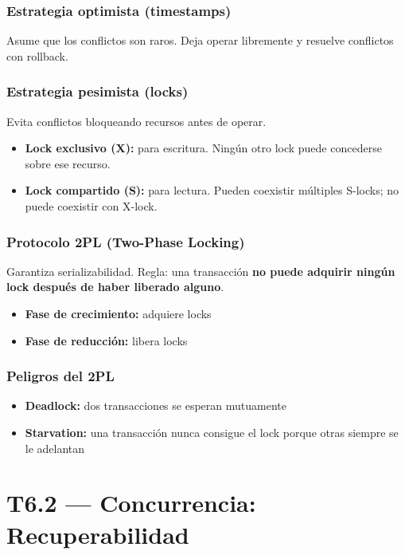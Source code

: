 \documentclass[12pt, a4paper]{article}
\begin{document}
\subsubsection{Estrategia optimista (timestamps)}
Asume que los conflictos son raros. Deja operar libremente y resuelve conflictos con rollback.

\subsubsection{Estrategia pesimista (locks)}
Evita conflictos bloqueando recursos antes de operar.

\begin{itemize}
  \item \textbf{Lock exclusivo (X):} para escritura. Ningún otro lock puede concederse sobre ese recurso.
  \item \textbf{Lock compartido (S):} para lectura. Pueden coexistir múltiples S-locks; no puede coexistir con X-lock.
\end{itemize}

\subsubsection{Protocolo 2PL (Two-Phase Locking)}
Garantiza serializabilidad. Regla: una transacción \textbf{no puede adquirir ningún lock después de haber liberado alguno}.
\begin{itemize}
  \item \textbf{Fase de crecimiento:} adquiere locks
  \item \textbf{Fase de reducción:} libera locks
\end{itemize}

\subsubsection{Peligros del 2PL}
\begin{itemize}
  \item \textbf{Deadlock:} dos transacciones se esperan mutuamente
  \item \textbf{Starvation:} una transacción nunca consigue el lock porque otras siempre se le adelantan
\end{itemize}

\section{T6.2 — Concurrencia: Recuperabilidad}
\end{document}

